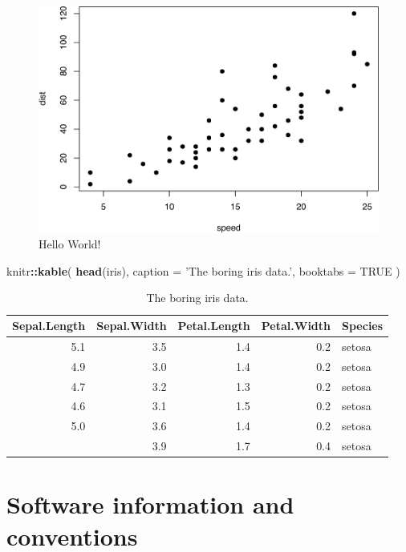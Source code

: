 \documentclass[
]{krantz}
\makeatletter
\newenvironment{Shaded}{\begin{snugshade}}{\end{snugshade}}
\newcommand{\DataTypeTok}[1]{\textcolor[rgb]{0.27,0.27,0.27}{#1}}
\newcommand{\KeywordTok}[1]{\textcolor[rgb]{0.27,0.27,0.27}{\textbf{#1}}}
\newcommand{\NormalTok}[1]{#1}
\newcommand{\OperatorTok}[1]{\textcolor[rgb]{0.43,0.43,0.43}{\textbf{#1}}}
\newcommand{\OtherTok}[1]{\textcolor[rgb]{0.37,0.37,0.37}{#1}}
\newcommand{\StringTok}[1]{\textcolor[rgb]{0.5,0.5,0.5}{#1}}
\newenvironment{kframe}{%
\medskip{}
\setlength{\fboxsep}{.8em}
 \def\at@end@of@kframe{}%
 \ifinner\ifhmode%
  \def\at@end@of@kframe{\end{minipage}}%
  \begin{minipage}{\columnwidth}%
 \fi\fi%
 \def\FrameCommand##1{\hskip\@totalleftmargin \hskip-\fboxsep
 \colorbox{shadecolor}{##1}\hskip-\fboxsep
     \hskip-\linewidth \hskip-\@totalleftmargin \hskip\columnwidth}%
 \MakeFramed {\advance\hsize-\width
   \@totalleftmargin\z@ \linewidth\hsize
   \@setminipage}}%
 {\par\unskip\endMakeFramed%
 \at@end@of@kframe}
\renewenvironment{Shaded}{\begin{kframe}}{\end{kframe}}
\makeatother
\begin{document}
\begin{figure}
\includegraphics[width=0.9\linewidth]{bookdown_files/figure-latex/hello2-1} \caption{Hello World!}\label{fig:hello2}
\end{figure}

\begin{Shaded}
\begin{Highlighting}[]
\NormalTok{knitr}\OperatorTok{::}\KeywordTok{kable}\NormalTok{(}
  \KeywordTok{head}\NormalTok{(iris), }\DataTypeTok{caption =} \StringTok{'The boring iris data.'}\NormalTok{,}
  \DataTypeTok{booktabs =} \OtherTok{TRUE}
\NormalTok{)}
\end{Highlighting}
\end{Shaded}

\begin{table}

\caption{\label{tab:iris2}The boring iris data.}
\centering
\begin{tabular}[t]{rrrrl}
\toprule
Sepal.Length & Sepal.Width & Petal.Length & Petal.Width & Species\\
\midrule
5.1 & 3.5 & 1.4 & 0.2 & setosa\\
4.9 & 3.0 & 1.4 & 0.2 & setosa\\
4.7 & 3.2 & 1.3 & 0.2 & setosa\\
4.6 & 3.1 & 1.5 & 0.2 & setosa\\
5.0 & 3.6 & 1.4 & 0.2 & setosa\\
\addlinespace
5.4 & 3.9 & 1.7 & 0.4 & setosa\\
\bottomrule
\end{tabular}
\end{table}

\hypertarget{software-information-and-conventions}{%
\section*{Software information and conventions}\label{software-information-and-conventions}}
\end{document}
